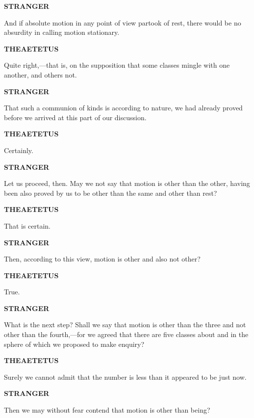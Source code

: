 \documentclass[11pt,letter]{article}
\begin{document}
\par \textbf{STRANGER}
\par   And if absolute motion in any point of view partook of rest, there would be no absurdity in calling motion stationary.

\par \textbf{THEAETETUS}
\par   Quite right,—that is, on the supposition that some classes mingle with one another, and others not.

\par \textbf{STRANGER}
\par   That such a communion of kinds is according to nature, we had already proved before we arrived at this part of our discussion.

\par \textbf{THEAETETUS}
\par   Certainly.

\par \textbf{STRANGER}
\par   Let us proceed, then. May we not say that motion is other than the other, having been also proved by us to be other than the same and other than rest?

\par \textbf{THEAETETUS}
\par   That is certain.

\par \textbf{STRANGER}
\par   Then, according to this view, motion is other and also not other?

\par \textbf{THEAETETUS}
\par   True.

\par \textbf{STRANGER}
\par   What is the next step? Shall we say that motion is other than the three and not other than the fourth,—for we agreed that there are five classes about and in the sphere of which we proposed to make enquiry?

\par \textbf{THEAETETUS}
\par   Surely we cannot admit that the number is less than it appeared to be just now.

\par \textbf{STRANGER}
\par   Then we may without fear contend that motion is other than being?
\end{document}
